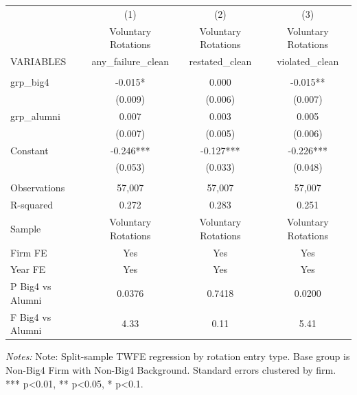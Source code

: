 \documentclass[10pt]{article}
\begin{document}
\begin{minipage}{19cm}\fontsize{10}{12}\selectfont\setlength{\tabcolsep}{4pt}\renewcommand{\arraystretch}{1.12}


\centering
{}
\begin{threeparttable}
\begin{tabular}{p{}ccc}
\toprule
 & (1) & (2) & (3) \\
 & Voluntary Rotations & Voluntary Rotations & Voluntary Rotations \\
VARIABLES & any\_failure\_clean & restated\_clean & violated\_clean \\
\midrule
 &  &  &  \\
grp\_big4 & -0.015* & 0.000 & -0.015** \\
 & (0.009) & (0.006) & (0.007) \\
grp\_alumni & 0.007 & 0.003 & 0.005 \\
 & (0.007) & (0.005) & (0.006) \\
Constant & -0.246*** & -0.127*** & -0.226*** \\
 & (0.053) & (0.033) & (0.048) \\
 &  &  &  \\
Observations & 57,007 & 57,007 & 57,007 \\
R-squared & 0.272 & 0.283 & 0.251 \\
Sample & Voluntary Rotations & Voluntary Rotations & Voluntary Rotations \\
Firm FE & Yes & Yes & Yes \\
Year FE & Yes & Yes & Yes \\
P Big4 vs Alumni & 0.0376 & 0.7418 & 0.0200 \\
F Big4 vs Alumni & 4.33 & 0.11 & 5.41 \\
\bottomrule
\end{tabular}
\begin{tablenotes}\fontsize{9}{11}\selectfont
\item \raggedright \fontsize{9}{11}\selectfont \textit{Notes:} Note: Split-sample TWFE regression by rotation entry type. Base group is Non-Big4 Firm with Non-Big4 Background. Standard errors clustered by firm. *** p<0.01, ** p<0.05, * p<0.1.
\end{tablenotes}
\end{threeparttable}

\end{minipage}
\end{document}
